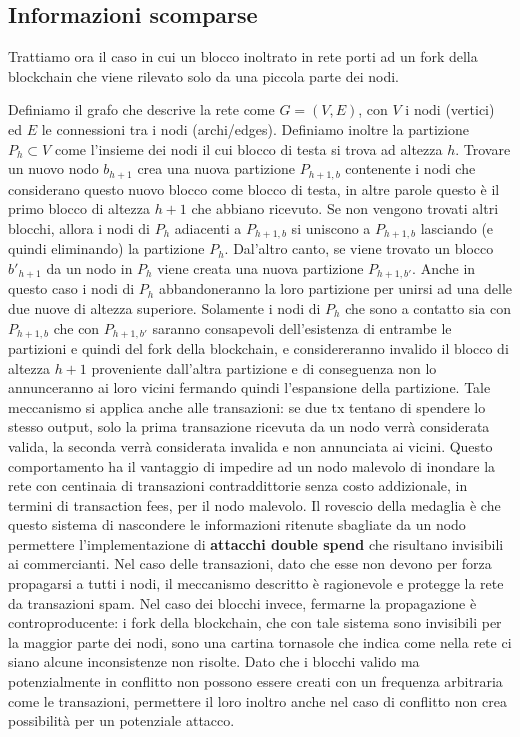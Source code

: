 \subsection{Informazioni scomparse}\label{informazioni-scomparse}

Trattiamo ora il caso in cui un blocco inoltrato in rete porti ad un fork della blockchain che viene rilevato solo da una piccola parte dei nodi.

Definiamo il grafo che descrive la rete come $G = (V,E)$, con $V$ i nodi (vertici) ed $E$ le connessioni tra i nodi (archi/edges). Definiamo inoltre la partizione $P_h \subset V$ come l'insieme dei nodi il cui blocco di testa si trova ad altezza $h$. Trovare un nuovo nodo $b_{h+1}$ crea una nuova partizione $P_{h+1,b}$ contenente i nodi che considerano questo nuovo blocco come blocco di testa, in altre parole questo è il primo blocco di altezza $h+1$ che abbiano ricevuto. Se non vengono trovati altri blocchi, allora i nodi di $P_h$ adiacenti a $P_{h+1,b}$ si uniscono a $P_{h+1,b}$ lasciando (e quindi eliminando) la partizione $P_h$. Dal'altro canto, se viene trovato un blocco $b'_{h+1}$ da un nodo in $P_h$ viene creata una nuova partizione $P_{h+1,b'}$. Anche in questo caso i nodi di $P_h$ abbandoneranno la loro partizione per unirsi ad una delle due nuove di altezza superiore. Solamente i nodi di $P_h$ che sono a contatto sia con $P_{h+1,b}$ che con $P_{h+1,b'}$ saranno consapevoli dell'esistenza di entrambe le partizioni e quindi del fork della blockchain, e considereranno invalido il blocco di altezza $h+1$ proveniente dall'altra partizione e di conseguenza non lo annunceranno ai loro vicini fermando quindi l'espansione della partizione. Tale meccanismo si applica anche alle transazioni: se due tx tentano di spendere lo stesso output, solo la prima transazione ricevuta da un nodo verrà considerata valida, la seconda verrà considerata invalida e non annunciata ai vicini. Questo comportamento ha il vantaggio di impedire ad un nodo malevolo di inondare la rete con centinaia di transazioni contraddittorie senza costo addizionale, in termini di transaction fees, per il nodo malevolo. Il rovescio della medaglia è che questo sistema di nascondere le informazioni ritenute sbagliate da un nodo permettere l'implementazione di \textbf{attacchi double spend} che risultano invisibili ai commercianti. Nel caso delle transazioni, dato che esse non devono per forza propagarsi a tutti i nodi, il meccanismo descritto è ragionevole e protegge la rete da transazioni spam. Nel caso dei blocchi invece, fermarne la propagazione è controproducente: i fork della blockchain, che con tale sistema sono invisibili per la maggior parte dei nodi, sono una cartina tornasole che indica come nella rete ci siano alcune inconsistenze non risolte. Dato che i blocchi valido ma potenzialmente in conflitto non possono essere creati con un frequenza arbitraria come le transazioni, permettere il loro inoltro anche nel caso di conflitto non crea possibilità per un potenziale attacco.

